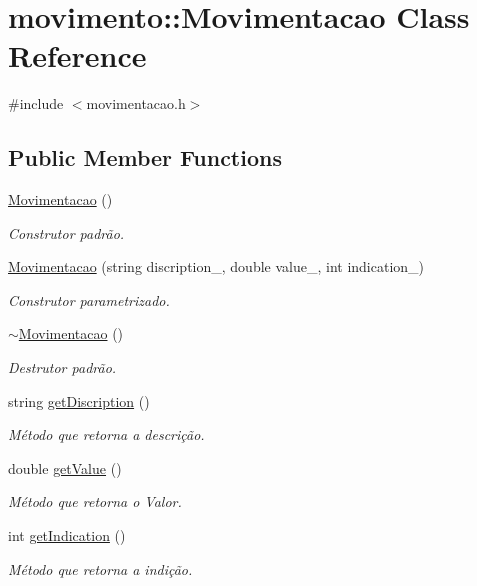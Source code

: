 \hypertarget{classmovimento_1_1Movimentacao}{}\section{movimento\+:\+:Movimentacao Class Reference}
\label{classmovimento_1_1Movimentacao}


{\ttfamily \#include $<$movimentacao.\+h$>$}

\subsection*{Public Member Functions}
\begin{DoxyCompactItemize}
\item 
\hyperlink{classmovimento_1_1Movimentacao_a51a5e6aa20dda8f91388dd4431bbec6a}{Movimentacao} ()
\begin{DoxyCompactList}\small\item\em Construtor padrão. \end{DoxyCompactList}\item 
\hyperlink{classmovimento_1_1Movimentacao_a99f38d943e74eeb784595970a5753d55}{Movimentacao} (string discription\+\_\+, double value\+\_\+, int indication\+\_\+)
\begin{DoxyCompactList}\small\item\em Construtor parametrizado. \end{DoxyCompactList}\item 
\hyperlink{classmovimento_1_1Movimentacao_a77193fb4d3bd0210846c8375c0707ff5}{$\sim$\+Movimentacao} ()
\begin{DoxyCompactList}\small\item\em Destrutor padrão. \end{DoxyCompactList}\item 
string \hyperlink{classmovimento_1_1Movimentacao_a60d70ae37cd1513f0a3ea85e29032319}{get\+Discription} ()
\begin{DoxyCompactList}\small\item\em Método que retorna a descrição. \end{DoxyCompactList}\item 
double \hyperlink{classmovimento_1_1Movimentacao_acbd1a5baf62ce795e758b47a27ee4124}{get\+Value} ()
\begin{DoxyCompactList}\small\item\em Método que retorna o Valor. \end{DoxyCompactList}\item 
int \hyperlink{classmovimento_1_1Movimentacao_a73adba299058efa36f3a40a864002d79}{get\+Indication} ()
\begin{DoxyCompactList}\small\item\em Método que retorna a indição. \end{DoxyCompactList}\end{DoxyCompactItemize}
